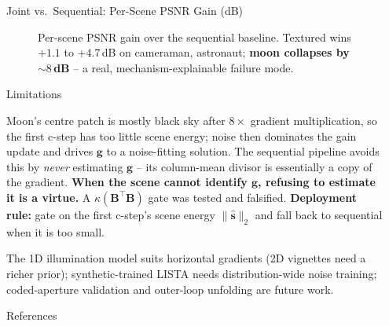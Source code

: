 \documentclass[final]{beamer}
\newlength{\sepwidth}
\newlength{\colwidth}
\newcommand{\separatorcolumn}{
  \begin{column}{\sepwidth}
\end{column}}
\begin{document}
\begin{frame}[t]
\begin{columns}[t]
\begin{column}{\colwidth}
\begin{exampleblock}{Joint vs.\ Sequential: Per-Scene PSNR Gain (dB)}
\begin{figure}
          \caption{Per-scene PSNR gain over the sequential baseline.
            Textured wins $+1.1$ to $+4.7$\,dB on cameraman, astronaut;
            \textbf{moon collapses by $\sim 8$\,dB} -- a real,
          mechanism-explainable failure mode.}
        \end{figure}

      \end{exampleblock}

      \medskip

      \begin{block}{Limitations}

        Moon's centre patch is mostly black sky after $8{\times}$ gradient
        multiplication, so the first c-step has too little scene energy;
        noise then dominates the gain update and drives $\boldsymbol{g}$
        to a noise-fitting solution.
        The sequential pipeline avoids this by \emph{never} estimating
        $\boldsymbol{g}$ -- its column-mean divisor is essentially a copy
        of the gradient. \textbf{When the scene cannot identify
        $\boldsymbol{g}$, refusing to estimate it is a virtue.}
        A $\kappa(\boldsymbol{B}^{\!\top}\!\boldsymbol{B})$ gate was tested
        and falsified. \textbf{Deployment rule:} gate on the first c-step's
        scene energy $\|\hat{\boldsymbol{s}}\|_2$ and fall back to sequential
        when it is too small.

        The 1D illumination model suits horizontal gradients (2D
        vignettes need a richer prior); synthetic-trained LISTA needs
        distribution-wide noise training; coded-aperture validation
        and outer-loop unfolding are future work.

      \end{block}

      \vfill

      \begin{block}{References}

        \nocite{*}
        \renewcommand{\bibsep}{1pt}
        {\fontsize{14pt}{16pt}\selectfont
        }

      \end{block}

    \end{column}

    \separatorcolumn
  \end{columns}
\end{frame}
\end{document}

